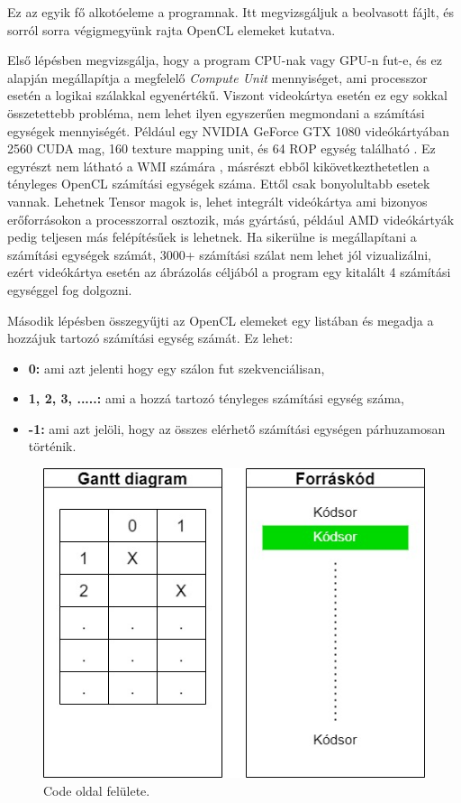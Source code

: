Ez az egyik fő alkotóeleme a programnak. Itt megvizsgáljuk a beolvasott fájlt, és sorról sorra végigmegyünk rajta OpenCL elemeket kutatva. 

Első lépésben megvizsgálja, hogy a program CPU-nak vagy GPU-n fut-e, és ez alapján megállapítja a megfelelő \textit{Compute Unit} mennyiséget, ami processzor esetén a logikai szálakkal egyenértékű. Viszont videokártya esetén ez egy sokkal összetettebb probléma, nem lehet ilyen egyszerűen megmondani a számítási egységek mennyiségét. Például egy NVIDIA GeForce GTX 1080 videókártyában 2560 CUDA mag, 160 texture mapping unit, és 64 ROP egység található \cite{1080}. Ez egyrészt nem látható a WMI számára \cite{wmi}, másrészt ebből kikövetkezthetetlen a tényleges OpenCL számítási egységek száma. Ettől csak bonyolultabb esetek vannak. Lehetnek Tensor \cite{tensor} magok is, lehet integrált videókártya ami bizonyos erőforrásokon a processzorral osztozik, más gyártású, például AMD videókártyák pedig teljesen más felépítésűek is lehetnek. Ha sikerülne is megállapítani a számítási egységek számát, 3000+ számítási szálat nem lehet jól vizualizálni, ezért videókártya esetén az ábrázolás céljából a program egy kitalált 4 számítási egységgel fog dolgozni.

Második lépésben összegyűjti az OpenCL elemeket egy listában és megadja a hozzájuk tartozó számítási egység számát. Ez lehet:
\begin{itemize}
\item\textbf{0:}  ami azt jelenti hogy egy szálon fut szekvenciálisan,
\item\textbf{1, 2, 3, .....:}  ami a hozzá tartozó tényleges számítási egység száma,
\item\textbf{-1:}  ami azt jelöli, hogy az összes elérhető számítási egységen párhuzamosan történik.
\end{itemize}


\begin{figure}[h]
\centering
\includegraphics[scale=0.5]{images/Code_plan.jpg}
\caption{Code oldal felülete.}
\label{fig:code_plan}
\end{figure}

